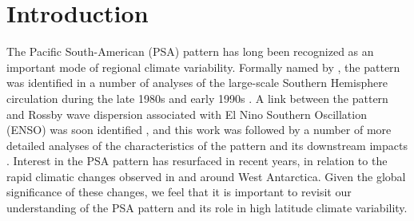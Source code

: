 \section{Introduction}

The Pacific South-American (PSA) pattern has long been recognized as an important mode of regional climate variability. Formally named by \cite{Mo1987}, the pattern was identified in a number of analyses of the large-scale Southern Hemisphere circulation during the late 1980s and early 1990s \citep[e.g.][]{Lau1994}. A link between the pattern and Rossby wave dispersion associated with El Nino Southern Oscillation (ENSO) was soon identified \citep[e.g.][]{Karoly1989}, and this work was followed by a number of more detailed analyses of the characteristics of the pattern and its downstream impacts \citep[e.g.][]{Mo1998,Mo2000,Mo2001}. Interest in the PSA pattern has resurfaced in recent years, in relation to the rapid climatic changes observed in and around West Antarctica. Given the global significance of these changes, we feel that it is important to revisit our understanding of the PSA pattern and its role in high latitude climate variability.     
